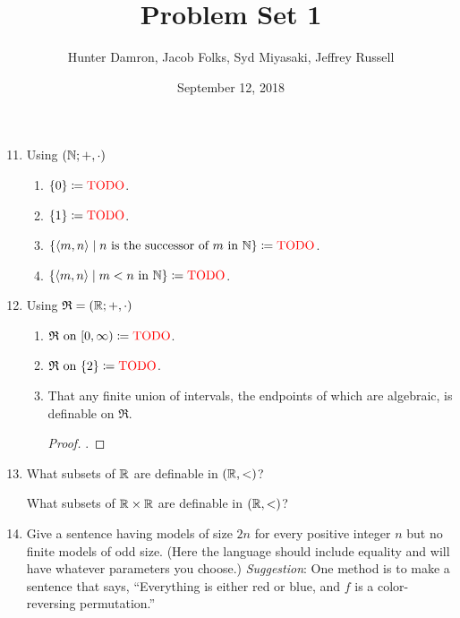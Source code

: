 \documentclass{homework}
\title{Problem Set 1}
\author{Hunter Damron, Jacob Folks, Syd Miyasaki, Jeffrey Russell}
\date{September 12, 2018}
\begin{document}
	\maketitle
	\begin{enumerate}
		\setcounter{enumi}{10}
		\item Using $(\mathbb{N}; +, \cdot)$
		\begin{enumerate}
			\item $\{0\} \coloneqq \text{\textcolor{red}{TODO}}$.
			\item $\{1\} \coloneqq \text{\textcolor{red}{TODO}}$.
			\item $\{\langle m,n \rangle \mid n \text{ is the successor of } m \text{ in } \mathbb{N}\} \coloneqq \text{\textcolor{red}{TODO}}$.
			\item $\{\langle m,n \rangle \mid m < n \text{ in } \mathbb{N}\} \coloneqq \text{\textcolor{red}{TODO}}$.
		\end{enumerate}
		\item Using $\mathfrak{R} = (\mathbb{R}; +, \cdot)$
		\begin{enumerate}
			\item $\mathfrak{R} \text{ on } [0, \infty) \coloneqq \text{\textcolor{red}{TODO}}$.
			\item $\mathfrak{R} \text{ on } \{2\} \coloneqq \text{\textcolor{red}{TODO}}$.
			\item That any finite union of intervals, the endpoints of which are algebraic, is definable on $\mathfrak{R}$.
			\begin{proof}
				\mTODO.
			\end{proof}
		\end{enumerate}
		
		\setcounter{enumi}{13}		
		\item What subsets of $\mathbb{R}$ are definable in $(\mathbb{R}, <)$? \TODO
		
		What subsets of $\mathbb{R}\times\mathbb{R}$ are definable in $(\mathbb{R}, <)$? \TODO
		
		\setcounter{enumi}{15}
		\item Give a sentence having models of size $2n$ for every positive integer $n$ but no finite models of odd size. (Here the language should include equality and will have whatever parameters you choose.) \emph{Suggestion}: One method is to make a sentence that says, ``Everything is either red or blue, and $f$ is a color-reversing permutation.''
		
		\TODO
	\end{enumerate}
\end{document}
